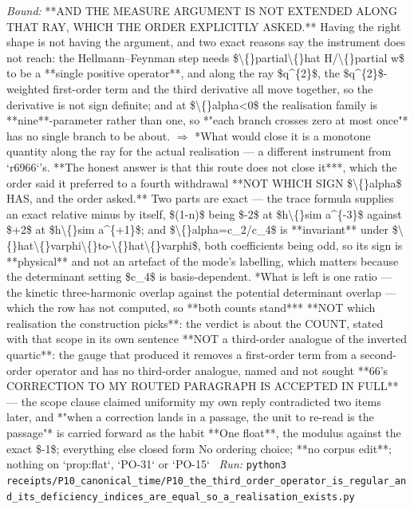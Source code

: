 \begin{description}
 \emph{Bound:}  **AND THE MEASURE ARGUMENT IS NOT EXTENDED ALONG THAT RAY, WHICH THE ORDER EXPLICITLY ASKED.** Having the right shape is not having the argument, and two exact reasons say the instrument does not reach: the Hellmann--Feynman step needs \$\textbackslash\{\}partial\textbackslash\{\}hat H/\textbackslash\{\}partial w\$ to be a **single positive operator**, and along the ray \$q\textasciicircum{}\{2\}\$, the \$q\textasciicircum{}\{2\}\$-weighted first-order term and the third derivative all move together, so the derivative is not sign definite; and at \$\textbackslash\{\}alpha<0\$ the realisation family is **nine**-parameter rather than one, so *"each branch crosses zero at most once"* has no single branch to be about. \ensuremath{\Rightarrow} *What would close it is a monotone quantity along the ray for the actual realisation --- a different instrument from `r6966`'s. **The honest answer is that this route does not close it***, which the order said it preferred to a fourth withdrawal  **NOT WHICH SIGN \$\textbackslash\{\}alpha\$ HAS, and the order asked.** Two parts are exact --- the trace formula supplies an exact relative minus by itself, \$(1-n)\$ being \$-2\$ at \$h\textbackslash\{\}sim a\textasciicircum{}\{-3\}\$ against \$+2\$ at \$h\textbackslash\{\}sim a\textasciicircum{}\{+1\}\$; and \$\textbackslash\{\}alpha=c\_2/c\_4\$ is **invariant** under \$\textbackslash\{\}hat\textbackslash\{\}varphi\textbackslash\{\}to-\textbackslash\{\}hat\textbackslash\{\}varphi\$, both coefficients being odd, so its sign is **physical** and not an artefact of the mode's labelling, which matters because the determinant setting \$c\_4\$ is basis-dependent. *What is left is one ratio --- the kinetic three-harmonic overlap against the potential determinant overlap --- which the row has not computed, so **both counts stand***  **NOT which realisation the construction picks**: the verdict is about the COUNT, stated with that scope in its own sentence  **NOT a third-order analogue of the inverted quartic**: the gauge that produced it removes a first-order term from a second-order operator and has no third-order analogue, named and not sought  **66's CORRECTION TO MY ROUTED PARAGRAPH IS ACCEPTED IN FULL** --- the scope clause claimed uniformity my own reply contradicted two items later, and *"when a correction lands in a passage, the unit to re-read is the passage"* is carried forward as the habit  **One float**, the modulus against the exact \$-1\$; everything else closed form  No ordering choice; **no corpus edit**; nothing on `prop:flat`, `PO-31` or `PO-15`
\ \emph{Run:} \texttt{python3 receipts/P10\_canonical\_time/P10\_the\_third\_order\_operator\_is\_regular\_and\_its\_deficiency\_indices\_are\_equal\_so\_a\_realisation\_exists.py}

\end{description}
